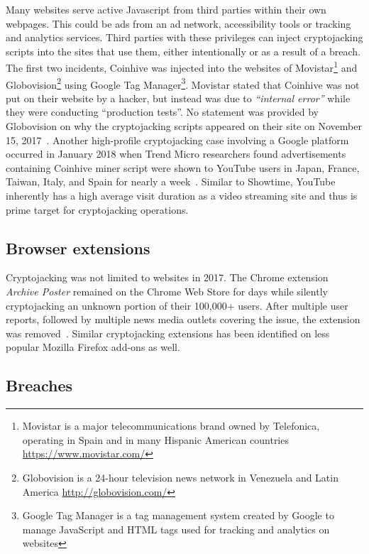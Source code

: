 Many websites serve active Javascript from third parties within their own webpages. This could be ads from an ad network, accessibility tools or tracking and analytics services. Third parties with these privileges can inject cryptojacking scripts into the sites that use them, either intentionally or as a result of a breach. The first two incidents, Coinhive was injected into the websites of Movistar\footnote{Movistar is a major telecommunications brand owned by Telefonica, operating in Spain and in many Hispanic American countries \url{https://www.movistar.com/}} and Globovision\footnote{Globovision is a 24-hour television news network in Venezuela and Latin America \url{http://globovision.com/}} using Google Tag Manager\footnote{Google Tag Manager is a tag management system created by Google to manage JavaScript and HTML tags used for tracking and analytics on websites}. Movistar stated that Coinhive was not put on their website by a hacker, but instead was due to \textit{``internal error''} while they were conducting ``production tests''. No statement was provided by Globovision on why the cryptojacking scripts appeared on their site on November 15, 2017~\cite{googletagcoinhive}. Another high-profile cryptojacking case involving a Google platform occurred in January 2018 when Trend Micro researchers found advertisements containing Coinhive miner script were shown to YouTube users in Japan, France, Taiwan, Italy, and Spain for nearly a week~\cite{trendmicrocoinhive}. Similar to Showtime, YouTube inherently has a high average visit duration as a video streaming site and thus is prime target for cryptojacking operations.


\subsection{Browser extensions} 

Cryptojacking was not limited to websites in 2017. The Chrome extension \textit{Archive Poster} remained on the Chrome Web Store for days while silently cryptojacking an unknown portion of their 100,000+ users. After multiple user reports, followed by multiple news media outlets covering the issue, the extension was removed~\cite{chromeextentioncoinhive}. Similar cryptojacking extensions has been identified on less popular Mozilla Firefox add-ons as well. 


\subsection{Breaches} 

